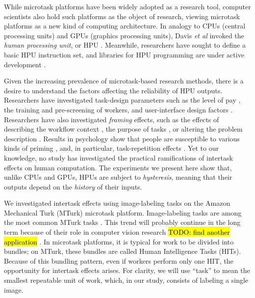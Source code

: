 \documentclass[12pt]{article}
\newcommand{\td}[1]{{\color{blu}\hl{TODO: #1}}}
\begin{document}
While microtask platforms have been widely adopted as a research tool,
computer scientists also hold such platforms as the object of 
research, viewing  microtask platforms as a new kind of computing 
architecture.  In analogy to CPUs (central 
processing units) and GPUs (graphics processing units), 
Davis \textit{et al} invoked the \textit{human processing unit}, or HPU \cite{5543192}.
Meanwhile, researchers have sought to define a basic HPU instruction set, and
libraries for HPU programming are under active development
 \cite{little2010turkit,minder2011crowdlang,minder2012crowdlang,kittur2011crowdforge}.  

Given the increasing prevalence of microtask-based research methods, there
is a desire to understand the factors affecting the reliability of HPU
outputs.  Researchers have investigated task-design parameters such as the 
level of pay \cite{kazai2013analysis}, the training \cite{le2010ensuring} and 
pre-screening \cite{paolacci2010running} of workers, and user-interface 
design factors \cite{Finnerty2013}.  
Researchers have also investigated \textit{framing} effects, 
such as the effects of describing the workflow context 
\cite{Kinnaird2012281}, the purpose of tasks 
\cite{chandler2013breaking}, or altering the problem description
\cite{thibodeau2013natural}.  Results in psychology show that people are 
susceptible to various kinds of priming 
\cite{BJOP1796,No2007,beller1971priming}, and, in particular, 
task-repetition effects \cite{Gass1999549,sohn2001task}.  
Yet to our knowledge, no study has investigated the practical ramifications 
of intertask effects on human computation. The experiments we 
present here show that, unlike CPUs and GPUs, HPUs are subject to 
\textit{hysteresis}, meaning that their outputs depend on the 
\textit{history} of their inputs.  

We investigated intertask effects using image-labeling tasks on the Amazon 
Mechanical Turk (MTurk) microtask platform.  Image-labeling tasks are among
the most common MTurk tasks \cite{chandler2013breaking,Berinsky2012351,Finnerty2013,paolacci2010running}.  This trend will probably continue 
in the long term because of their role in computer vision research 
\td{find another application} \cite{5543192}.  In microtask platforms, it is typical for work to be divided 
into bundles; on MTurk, these bundles are called Human Intelligence Tasks 
(HITs). Because of this bundling pattern, even if workers perform only one 
HIT, the opportunity for intertask effects arises.  For clarity, 
we will use ``task'' to mean the smallest repeatable unit of work, which, 
in our study, consists of labeling a single image.
\end{document}
